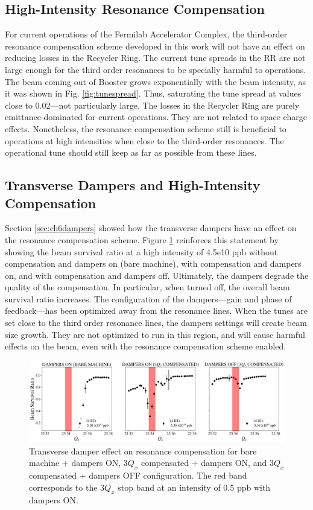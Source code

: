 \subsection{High-Intensity Resonance Compensation}

For current operations of the Fermilab Accelerator Complex, the third-order resonance compensation scheme developed in this work will not have an effect on reducing losses in the Recycler Ring. The current tune spreads in the RR are not large enough for the third order resonances to be specially harmful to operations. The beam coming out of Booster grows exponentially with the beam intensity, as it was shown in Fig. \ref{fig:tunespread}. Thus, saturating the tune spread at values close to 0.02---not particularly large. The losses in the Recycler Ring are purely emittance-dominated for current operations. They are not related to space charge effects. Nonetheless, the resonance compensation scheme still is beneficial to operations at high intensities when close to the third-order resonances. The operational tune should still keep as far as possible from these lines.  

\subsection{Transverse Dampers and High-Intensity Compensation}

Section \ref{sec:ch6dampers} showed how the transverse dampers have an effect on the resonance compensation scheme. Figure \ref{fig:dampers7} reinforces this statement by showing the beam survival ratio at a high intensity of 4.5e10 ppb without compensation and dampers on (bare machine), with compensation and dampers on, and with compensation and dampers off. Ultimately, the dampers degrade the quality of the compensation. In particular, when turned off, the overall beam survival ratio increases. The configuration of the dampers---gain and phase of feedback---has been optimized away from the resonance lines. When the tunes are set close to the third order resonance lines, the dampers settings will create beam size growth. They are not optimized to run in this region, and will cause harmful effects on the beam, even with the resonance compensation scheme enabled.

\begin{figure}[H]
    \centering
    \includegraphics[width=\columnwidth]{chapter7/dampers_config.png}
    \caption{Transverse damper effect on resonance compensation for bare machine + dampers ON, $3Q_x$ compensated + dampers ON, and $3Q_x$ compensated + dampers OFF configuration. The red band corresponds to the $3Q_x$ stop band at an intensity of 0.5 ppb with dampers ON.}
    \label{fig:dampers7}
\end{figure}

